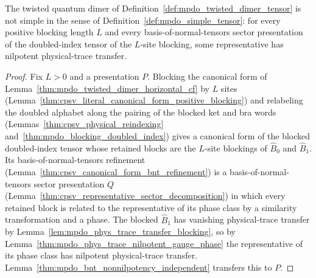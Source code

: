 \begin{lemma}%
    \label{thm:mpdo_twisted_dimer_not_simple}
    \leanok
    The twisted quantum dimer of Definition~\ref{def:mpdo_twisted_dimer_tensor}
    is not simple in the sense of Definition~\ref{def:mpdo_simple_tensor}: for
    every positive blocking length $L$ and every basis-of-normal-tensors sector presentation of
    the doubled-index tensor of the $L$-site blocking, some representative
    has nilpotent physical-trace transfer.
\end{lemma}
\begin{proof}\leanok
    Fix $L>0$ and a presentation $P$. Blocking the canonical form of
    Lemma~\ref{thm:mpdo_twisted_dimer_horizontal_cf} by $L$ sites
    (Lemma~\ref{thm:cpsv_literal_canonical_form_positive_blocking}) and
    relabeling the doubled alphabet along the pairing of the blocked ket and
    bra words (Lemmas~\ref{thm:cpsv_physical_reindexing}
    and~\ref{thm:mpdo_blocking_doubled_index}) gives a canonical form of the
    blocked doubled-index tensor whose retained blocks are the $L$-site
    blockings of $\widehat B_0$ and $\widehat B_1$. Its
    basis-of-normal-tensors refinement
    (Lemma~\ref{thm:cpsv_canonical_form_bnt_refinement}) is a
    basis-of-normal-tensors sector
    presentation $Q$
    (Lemma~\ref{thm:cpsv_representative_sector_decomposition}) in which
    every retained block is related to the representative of its phase class
    by a similarity transformation and a phase.
    The blocked $\widehat B_1$ has vanishing physical-trace
    transfer by Lemma~\ref{lem:mpdo_phys_trace_transfer_blocking}, so by
    Lemma~\ref{thm:mpdo_phys_trace_nilpotent_gauge_phase} the
    representative of its phase class has nilpotent physical-trace transfer.
    Lemma~\ref{thm:mpdo_bnt_nonnilpotency_independent} transfers this to
    $P$.
\end{proof}

